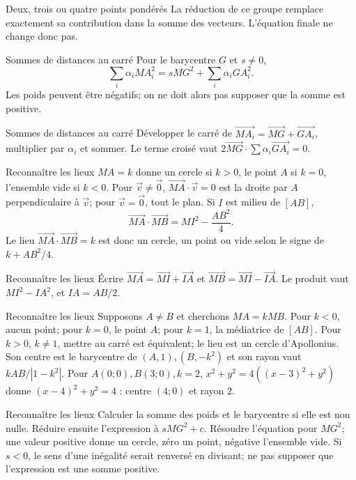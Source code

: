 \documentclass[aspectratio=169,10pt]{beamer}
\begin{document}
\begin{frame}{Deux, trois ou quatre points pondérés}
La réduction de ce groupe remplace exactement sa contribution dans la somme des vecteurs. L’équation finale ne change donc pas.
\end{frame}
\begin{frame}{Sommes de distances au carré}
Pour le barycentre \(G\) et \(s\ne0\),
\[
\sum_i\alpha_i MA_i^2=sMG^2+\sum_i\alpha_i GA_i^2.
\]
Les poids peuvent être négatifs; on ne doit alors pas supposer que la somme est positive.
\end{frame}
\begin{frame}{Sommes de distances au carré}
Développer le carré de \(\overrightarrow{MA_i}=\overrightarrow{MG}+\overrightarrow{GA_i}\), multiplier par \(\alpha_i\) et sommer. Le terme croisé vaut \(2\overrightarrow{MG}\cdot\sum\alpha_i\overrightarrow{GA_i}=0\).
\end{frame}
\begin{frame}{Reconnaître les lieux}
\(MA=k\) donne un cercle si \(k>0\), le point \(A\) si \(k=0\), l’ensemble vide si \(k<0\).
Pour \(\overrightarrow{v}\ne\vec0\), \(\overrightarrow{MA}\cdot\overrightarrow{v}=0\) est la droite par \(A\) perpendiculaire à \(\overrightarrow{v}\); pour \(\overrightarrow{v}=\vec0\), tout le plan.
Si \(I\) est milieu de \([AB]\),
\[
\overrightarrow{MA}\cdot\overrightarrow{MB}=MI^2-\dfrac{AB^2}{4}.
\]
Le lieu \(\overrightarrow{MA}\cdot\overrightarrow{MB}=k\) est donc un cercle, un point ou vide selon le signe de \(k+AB^2/4\).
\end{frame}
\begin{frame}{Reconnaître les lieux}
Écrire \(\overrightarrow{MA}=\overrightarrow{MI}+\overrightarrow{IA}\) et \(\overrightarrow{MB}=\overrightarrow{MI}-\overrightarrow{IA}\). Le produit vaut \(MI^2-IA^2\), et \(IA=AB/2\).
\end{frame}
\begin{frame}{Reconnaître les lieux}
Supposons \(A\ne B\) et cherchons \(MA=kMB\). Pour \(k<0\), aucun point; pour \(k=0\), le point \(A\); pour \(k=1\), la médiatrice de \([AB]\). Pour \(k>0\), \(k\ne1\), mettre au carré est équivalent; le lieu est un cercle d’Apollonius. Son centre est le barycentre de \((A,1),(B,-k^2)\) et son rayon vaut \(kAB/|1-k^2|\).
Pour \(A(0;0),B(3;0),k=2\), \(x^2+y^2=4((x-3)^2+y^2)\) donne \((x-4)^2+y^2=4\) : centre \((4;0)\) et rayon \(2\).
\end{frame}
\begin{frame}{Reconnaître les lieux}
Calculer la somme des poids et le barycentre si elle est non nulle. Réduire ensuite l’expression à \(sMG^2+c\). Résoudre l’équation pour \(MG^2\); une valeur positive donne un cercle, zéro un point, négative l’ensemble vide. Si \(s<0\), le sens d’une inégalité serait renversé en divisant; ne pas supposer que l’expression est une somme positive.
\end{frame}
\end{document}
